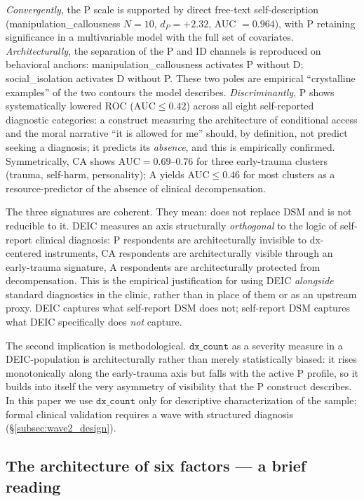 \emph{Convergently}, the P scale is supported by direct free-text self-description (manipulation\_callousness $N = 10$, $d_P = +2.32$, AUC $= 0.964$), with P retaining significance in a multivariable model with the full set of covariates. \emph{Architecturally}, the separation of the P and ID channels is reproduced on behavioral anchors: manipulation\_callousness activates P without D; social\_isolation activates D without P. These two poles are empirical ``crystalline examples'' of the two contours the model describes. \emph{Discriminantly}, P shows systematically lowered ROC ($\mathrm{AUC} \leq 0.42$) across all eight self-reported diagnostic categories: a construct measuring the architecture of conditional access and the moral narrative ``it is allowed for me'' should, by definition, not predict seeking a diagnosis; it predicts its \emph{absence}, and this is empirically confirmed. Symmetrically, CA shows $\mathrm{AUC} = 0.69$--$0.76$ for three early-trauma clusters (trauma, self-harm, personality); A yields $\mathrm{AUC} \leq 0.46$ for most clusters as a resource-predictor of the absence of clinical decompensation.

The three signatures are coherent. They mean: \DEIC{} does not replace DSM and is not reducible to it. DEIC measures an axis structurally \emph{orthogonal} to the logic of self-report clinical diagnosis: P respondents are architecturally invisible to dx-centered instruments, CA respondents are architecturally visible through an early-trauma signature, A respondents are architecturally protected from decompensation. This is the empirical justification for using DEIC \emph{alongside} standard diagnostics in the clinic, rather than in place of them or as an upstream proxy. DEIC captures what self-report DSM does not; self-report DSM captures what DEIC specifically does \emph{not} capture.

The second implication is methodological. $\texttt{dx\_count}$ as a severity measure in a DEIC-population is architecturally rather than merely statistically biased: it rises monotonically along the early-trauma axis but falls with the active P profile, so it builds into itself the very asymmetry of visibility that the P construct describes. In this paper we use $\texttt{dx\_count}$ only for descriptive characterization of the sample; formal clinical validation requires a wave with structured diagnosis (§\ref{subsec:wave2_design}).

\subsection{The architecture of six factors --- a brief reading}

